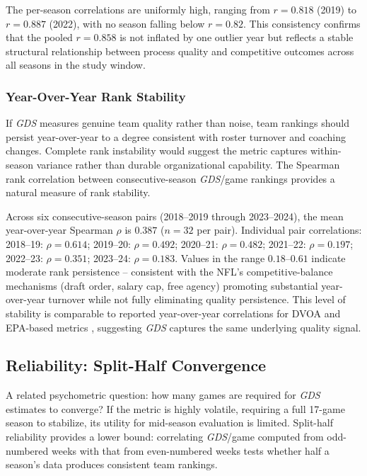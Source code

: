 \documentclass[12pt,a4paper]{article}
\newcommand{\gds}{\textit{GDS}}
\begin{document}
The per-season correlations are uniformly high, ranging from $r = 0.818$ (2019) to $r = 0.887$ (2022), with no season falling below $r = 0.82$. This consistency confirms that the pooled $r = 0.858$ is not inflated by one outlier year but reflects a stable structural relationship between process quality and competitive outcomes across all seasons in the study window.

\subsubsection{Year-Over-Year Rank Stability}

If \gds{} measures genuine team quality rather than noise, team rankings should persist year-over-year to a degree consistent with roster turnover and coaching changes. Complete rank instability would suggest the metric captures within-season variance rather than durable organizational capability. The Spearman rank correlation between consecutive-season \gds{}/game rankings provides a natural measure of rank stability.

Across six consecutive-season pairs (2018--2019 through 2023--2024), the mean year-over-year Spearman $\rho$ is $0.387$ ($n = 32$ per pair). Individual pair correlations: 2018--19: $\rho = 0.614$; 2019--20: $\rho = 0.492$; 2020--21: $\rho = 0.482$; 2021--22: $\rho = 0.197$; 2022--23: $\rho = 0.351$; 2023--24: $\rho = 0.183$. Values in the range $0.18$--$0.61$ indicate moderate rank persistence -- consistent with the NFL's competitive-balance mechanisms (draft order, salary cap, free agency) promoting substantial year-over-year turnover while not fully eliminating quality persistence. This level of stability is comparable to reported year-over-year correlations for DVOA and EPA-based metrics \citep{schatz2005dvoa}, suggesting \gds{} captures the same underlying quality signal.

\subsection{Reliability: Split-Half Convergence}
\label{sec:split-half}

A related psychometric question: how many games are required for \gds{} estimates to converge? If the metric is highly volatile, requiring a full 17-game season to stabilize, its utility for mid-season evaluation is limited. Split-half reliability provides a lower bound: correlating \gds{}/game computed from odd-numbered weeks with that from even-numbered weeks tests whether half a season's data produces consistent team rankings.
\end{document}
